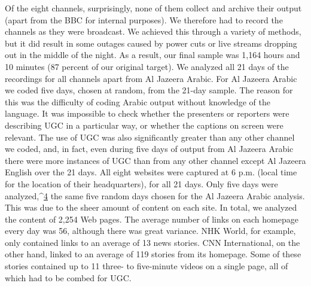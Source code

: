 \begin{enumerate}
Of the eight channels, surprisingly, none of them collect and archive their
output (apart from the BBC for internal purposes). We therefore had to
record the channels as they were broadcast. We achieved this through a
variety of methods, but it did result in some outages caused by power cuts
or live streams dropping out in the middle of the night. As a result, our final
sample was 1,164 hours and 10 minutes (87 percent of our original target).
We analyzed all 21 days of the recordings for all channels apart from Al
Jazeera Arabic. For Al Jazeera Arabic we coded five days, chosen at random,
from the 21-day sample. The reason for this was the difficulty of coding
Arabic output without knowledge of the language. It was impossible
to check whether the presenters or reporters were describing UGC in a
particular way, or whether the captions on screen were relevant. The use of
UGC was also significantly greater than any other channel we coded, and,
in fact, even during five days of output from Al Jazeera Arabic there were
more instances of UGC than from any other channel except Al Jazeera
English over the 21 days.
All eight websites were captured at 6 p.m. (local time for the location of
their headquarters), for all 21 days. Only five days were analyzed,^{\href{#endnotes}{4}} the same
five random days chosen for the Al Jazeera Arabic analysis. This was due to
the sheer amount of content on each site. In total, we analyzed the content
of 2,254 Web pages. The average number of links on each homepage every
day was 56, although there was great variance. NHK World, for example,
only contained links to an average of 13 news stories. CNN International,
on the other hand, linked to an average of 119 stories from its homepage.
Some of these stories contained up to 11 three- to five-minute videos on a
single page, all of which had to be combed for UGC.


\end{enumerate}
